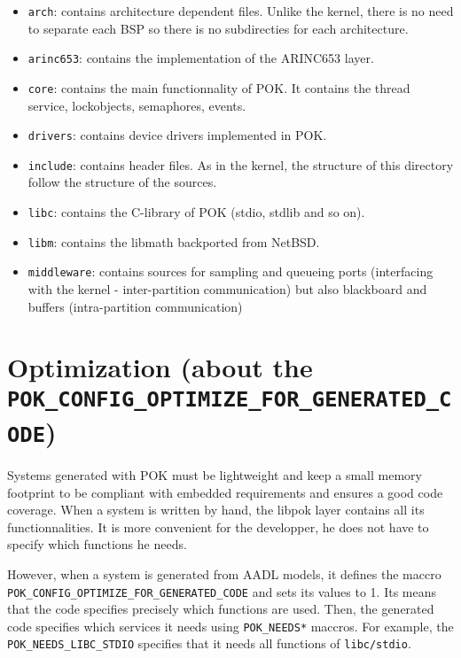 \documentclass[oneside]{article}
\begin{document}
   \begin{itemize}
      \item
         \texttt{arch}: contains architecture dependent files. Unlike the
         kernel, there is no need to separate each BSP so there is no
         subdirecties for each architecture.
      \item
         \texttt{arinc653}: contains the implementation of the ARINC653 layer.
      \item
         \texttt{core}: contains the main functionnality of POK. It contains the
         thread service, lockobjects, semaphores, events.
      \item
         \texttt{drivers}: contains device drivers implemented in POK.
      \item
         \texttt{include}: contains header files. As in the kernel, the
         structure of this directory follow the structure of the sources.
      \item
         \texttt{libc}: contains the C-library of POK (stdio, stdlib and so on).
      \item
         \texttt{libm}: contains the libmath backported from NetBSD.
      \item
         \texttt{middleware}: contains sources for sampling and queueing ports
         (interfacing with the kernel - inter-partition communication) but also blackboard and buffers
         (intra-partition communication)
   \end{itemize}


\section{Optimization (about the \texttt{POK\_CONFIG\_OPTIMIZE\_FOR\_GENERATED\_CODE})}
Systems generated with POK must be lightweight and keep a small memory footprint
to be compliant with embedded requirements and ensures a good code coverage.
When a system is written by hand, the libpok layer contains all its
functionnalities. It is more convenient for the developper, he does not have to
specify which functions he needs.

However, when a system is generated from AADL models, it defines the maccro 
\texttt{POK\_CONFIG\_OPTIMIZE\_FOR\_GENERATED\_CODE} and sets its values to 1.
Its means that the code specifies precisely which functions are used. Then, the
generated code specifies which services it needs using \texttt{POK\_NEEDS*}
maccros. For example, the \texttt{POK\_NEEDS\_LIBC\_STDIO} specifies that it
needs all functions of \texttt{libc/stdio}.
\end{document}
